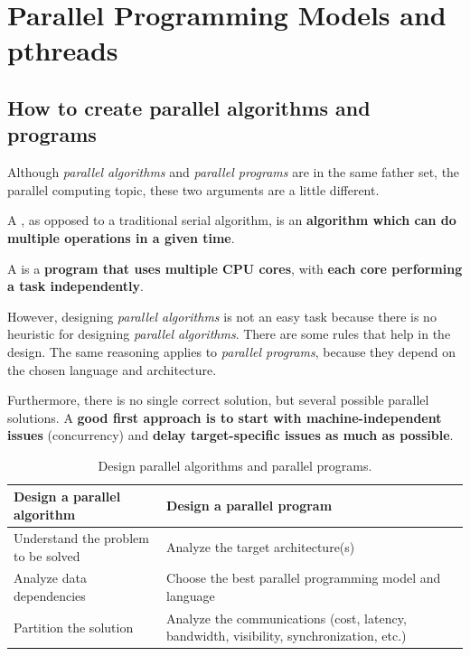 \section{Parallel Programming Models and pthreads}

\subsection{How to create parallel algorithms and programs}

Although \emph{parallel algorithms} and \emph{parallel programs} are in the same father set, the parallel computing topic, these two arguments are a little different.

\begin{definitionbox}
    A , as opposed to a traditional serial algorithm, is an \textbf{algorithm which can do multiple operations in a given time}.
\end{definitionbox}

\begin{definitionbox}
    A  is a \textbf{program that uses multiple CPU cores}, with \textbf{each core performing a task independently}.
\end{definitionbox}

\noindent
However, designing \emph{parallel algorithms} is not an easy task because there is no heuristic for designing \emph{parallel algorithms}. There are some rules that help in the design. The same reasoning applies to \emph{parallel programs}, because they depend on the chosen language and architecture.

\highspace
Furthermore, there is no single correct solution, but several possible parallel solutions. A \textbf{good first approach is to start with machine-independent issues} (concurrency) and \textbf{delay target-specific issues as much as possible}.

\begin{table}[!htp]
    \centering
    \begin{tabular}{@{} p{16em} p{16em} @{}}
        \toprule
        Design a parallel algorithm & Design a parallel program \\
        \midrule
        Understand the problem to be solved & Analyze the target architecture(s) \\
        \cmidrule{1-2}
        Analyze data dependencies & Choose the best parallel programming model and language \\
        \cmidrule{1-2}
        Partition the solution & Analyze the communications (cost, latency, bandwidth, visibility, synchronization, etc.) \\
        \bottomrule
    \end{tabular}
    \caption{Design parallel algorithms and parallel programs.}
\end{table}

